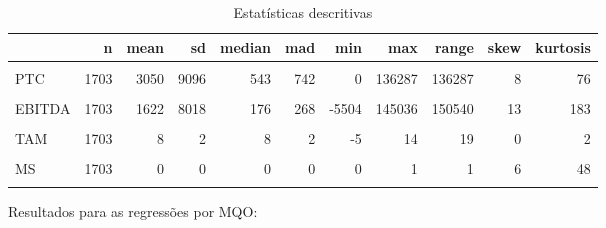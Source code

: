 \documentclass[
]{article}
\begin{document}
\begin{table}[!h]

\caption{\label{tab:estdesc}Estatísticas descritivas}
\centering
\begin{tabular}[t]{lrrrrrrrrrr}
\toprule
  & n & mean & sd & median & mad & min & max & range & skew & kurtosis\\
\midrule
\cellcolor{gray!6}{ATC} & \cellcolor{gray!6}{1703} & \cellcolor{gray!6}{4074} & \cellcolor{gray!6}{11950} & \cellcolor{gray!6}{790} & \cellcolor{gray!6}{1085} & \cellcolor{gray!6}{0} & \cellcolor{gray!6}{168607} & \cellcolor{gray!6}{168607} & \cellcolor{gray!6}{8} & \cellcolor{gray!6}{83}\\
PTC & 1703 & 3050 & 9096 & 543 & 742 & 0 & 136287 & 136287 & 8 & 76\\
\cellcolor{gray!6}{ATR} & \cellcolor{gray!6}{1703} & \cellcolor{gray!6}{13848} & \cellcolor{gray!6}{59612} & \cellcolor{gray!6}{2034} & \cellcolor{gray!6}{2734} & \cellcolor{gray!6}{0} & \cellcolor{gray!6}{987419} & \cellcolor{gray!6}{987419} & \cellcolor{gray!6}{12} & \cellcolor{gray!6}{168}\\
EBITDA & 1703 & 1622 & 8018 & 176 & 268 & -5504 & 145036 & 150540 & 13 & 183\\
\cellcolor{gray!6}{RT} & \cellcolor{gray!6}{1703} & \cellcolor{gray!6}{7491} & \cellcolor{gray!6}{25016} & \cellcolor{gray!6}{1092} & \cellcolor{gray!6}{1505} & \cellcolor{gray!6}{0} & \cellcolor{gray!6}{321638} & \cellcolor{gray!6}{321638} & \cellcolor{gray!6}{8} & \cellcolor{gray!6}{79}\\
\addlinespace
TAM & 1703 & 8 & 2 & 8 & 2 & -5 & 14 & 19 & 0 & 2\\
\cellcolor{gray!6}{ROA} & \cellcolor{gray!6}{1703} & \cellcolor{gray!6}{0} & \cellcolor{gray!6}{1} & \cellcolor{gray!6}{0} & \cellcolor{gray!6}{0} & \cellcolor{gray!6}{-19} & \cellcolor{gray!6}{1} & \cellcolor{gray!6}{20} & \cellcolor{gray!6}{-25} & \cellcolor{gray!6}{760}\\
MS & 1703 & 0 & 0 & 0 & 0 & 0 & 1 & 1 & 6 & 48\\
\cellcolor{gray!6}{IHH} & \cellcolor{gray!6}{1703} & \cellcolor{gray!6}{1686} & \cellcolor{gray!6}{1626} & \cellcolor{gray!6}{928} & \cellcolor{gray!6}{488} & \cellcolor{gray!6}{589} & \cellcolor{gray!6}{8266} & \cellcolor{gray!6}{7677} & \cellcolor{gray!6}{2} & \cellcolor{gray!6}{6}\\
\bottomrule
\end{tabular}
\end{table}

Resultados para as regressões por MQO:
\end{document}
